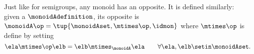 %
%
%
%

\begin{remark}
    Just like for semigroups, any monoid has an opposite.
    It is defined similarly: given a  $\monoidAdefinition$, its opposite is $\monoidA \op = \tup{ \monoidAset, \mtimes\op, \idmon }$ where $\mtimes\op$ is define by setting
    \begin{equation}
        \ela \mtimes \op \elb = \elb \mtimes_{\monoidA} \ela \qquad \forall \ela, \elb \setin \monoidAset.
    \end{equation}
\end{remark}

